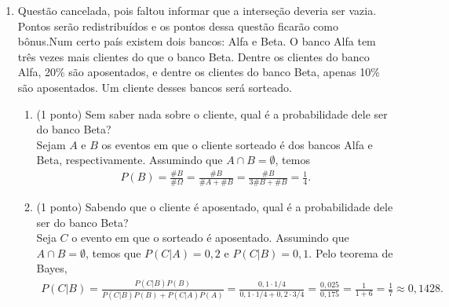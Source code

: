\documentclass{article}
\begin{document}
\begin{enumerate}

\item {\color{red} Questão cancelada, pois faltou informar que a interseção deveria ser vazia. Pontos serão redistribuídos e os pontos dessa questão ficarão como bônus.}Num certo país existem dois bancos: Alfa e Beta. O banco Alfa tem três vezes mais clientes do que o banco Beta. Dentre os clientes do banco Alfa, 20\% são aposentados, e dentre os clientes do banco Beta, apenas 10\% são aposentados. Um cliente desses bancos será sorteado.
\begin{enumerate}
	\item (1 ponto) Sem saber nada sobre o cliente, qual é a probabilidade dele ser do banco Beta?\\{
	\color{red}
	Sejam $A$ e $B$ os eventos em que o cliente sorteado é dos bancos Alfa e Beta, respectivamente. Assumindo que $A \cap B = \emptyset$, temos
	\begin{align*}
	P(B) = \frac{\#B}{\#\Omega} = \frac{\#B}{\# A + \# B} = \frac{\# B}{3\# B + \# B} = \frac{1}{4}. 
	\end{align*}
	}
	
	\item (1 ponto) Sabendo que o cliente é aposentado, qual é a probabilidade dele ser do banco Beta?\\{
	\color{red}
	Seja $C$ o evento em que o sorteado é aposentado. Assumindo que $A \cap B = \emptyset$, temos que $P(C|A) = 0,2$ e $P(C|B) = 0,1$. Pelo teorema de Bayes,
	\begin{align*}
	P(C|B) = \frac{P(C|B)P(B)}{P(C|B)P(B) + P(C|A)P(A)} = \frac{0,1 \cdot 1/4}{0,1 \cdot 1/4 + 0,2 \cdot 3/4} = \frac{0,025}{0,175} = \frac{1}{1 + 6} = \frac{1}{7} \approx 0,1428.
	\end{align*}
	}

\end{enumerate}



\end{enumerate}
\end{document}
